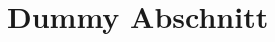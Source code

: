 \documentclass[11pt, a4paper]{scrartcl}
\begin{document}
    \section*{Dummy Abschnitt}
    \blindtext[9]
\end{document}
